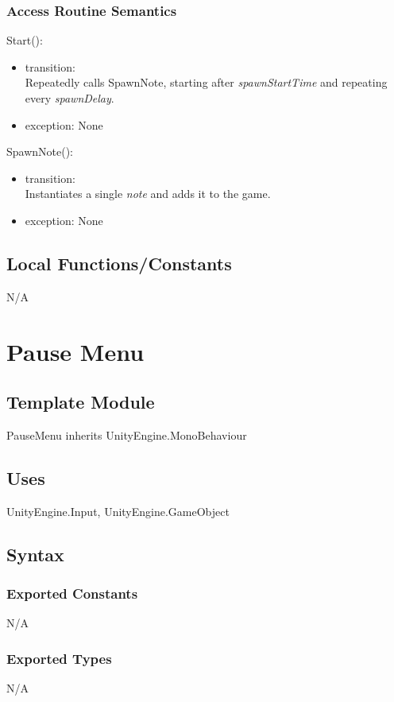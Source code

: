 \documentclass[12pt]{article}
\begin{document}
\subsubsection{Access Routine Semantics}
\noindent Start():
\begin{itemize}
	\item transition:\\
	    Repeatedly calls SpawnNote, starting after \textit{spawnStartTime} and repeating every \textit{spawnDelay}.
	\item exception: None
\end{itemize}
\noindent SpawnNote():
\begin{itemize}
	\item transition:\\
	    Instantiates a single \textit{note} and adds it to the game.
	\item exception: None
\end{itemize}

\subsection{Local Functions/Constants}
N/A

\newpage

\section{Pause Menu}

\subsection{Template Module}
PauseMenu inherits UnityEngine.MonoBehaviour

\subsection {Uses}
UnityEngine.Input, UnityEngine.GameObject

\subsection {Syntax}

\subsubsection {Exported Constants}
N/A
\subsubsection {Exported Types}
N/A
\end{document}
